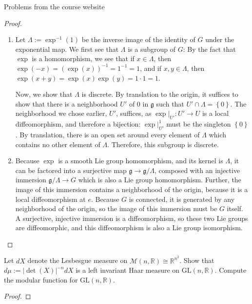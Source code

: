 \documentclass[12pt]{article}
\newcommand{\R}{\mathbb{R}}
\theoremstyle{definition}
\newenvironment{problem}[2][Problem]{\begin{trivlist}
\item[\hskip \labelsep {\bfseries #1}\hskip \labelsep {\bfseries #2.}]}{\end{trivlist}}
\begin{document}
\begin{section}{Problems from the course website}
\begin{proof}
\begin{enumerate}[label=(\alph*)]
		\item Let $\Lambda:= \exp^{-1}(1)$ be the inverse image of the identity of $G$ under the exponential map. We first see that $\Lambda$ is a subgroup of $G$: By the fact that $\exp$ is a homomorphism, we see that if $x \in \Lambda$, then $\exp(-x) = (\exp(x))^{-1} = 1^{-1} = 1$, and if $x, y \in \Lambda$, then $\exp(x + y) = \exp(x)\exp(y) = 1\cdot 1 = 1$.
			\par Now, we show that $\Lambda$ is discrete. By translation to the origin, it suffices to show that there is a neighborhood $U'$ of $0$ in $\mathfrak g$ such that $U' \cap \Lambda = \left\{ 0 \right\}$. The neighborhood we chose earlier, $U'$, suffices, as $\exp\lvert_{U'}:  U' \to U$ is a local diffeomorphism, and therefore a bijection: $\exp\lvert_{U'}^{1}$ must be the singleton $\left\{ 0 \right\}$. By translation, there is an open set around every element of $\Lambda$ which contains no other element of $\Lambda$. Therefore, this subgroup is discrete.
		\item Because $\exp$ is a smooth Lie group homomorphism, and its kernel is $\Lambda$, it can be factored into a surjective map $\mathfrak g \to \mathfrak g / \Lambda$, composed with an injective immersion $\mathfrak g / \Lambda \to G$ which is also a Lie group homomorphism. Further, the image of this immersion contains a neighborhood of the origin, because it is a local diffeomorphism at $e$. Because $G$ is connected, it is generated by any neighborhood of the origin, so the image of this immersion must be $G$ itself. A surjective, injective immersion is a diffeomorphism, so these two Lie groups are diffeomorphic, and this diffeomorphism is also a Lie group isomorphism.
	\end{enumerate}
\end{proof}
\begin{problem}{4*}
	Let $dX$ denote the Lesbesgue measure on $\mathcal{M}(n, \R) \cong \R^{n^2}$. Show that $d\mu := \left \lvert { \det(X) } \right \lvert^{-n}dX$ is a left invariant Haar measure on $\text{GL}(n, \R)$. Compute the modular function for $\text{GL}(n, \R)$.
	
\end{problem}
\begin{proof}
	

\end{proof}
\end{section}
\end{document}
